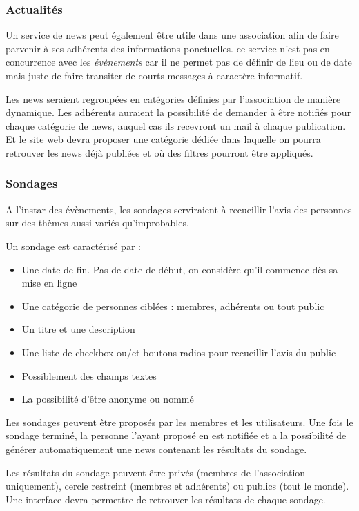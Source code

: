 \documentclass[a4paper,12pt]{article}
\begin{document}
\subsubsection{Actualités}
	Un service de news peut également être utile dans une association afin de faire parvenir à ses adhérents des informations ponctuelles. ce service n'est pas en concurrence avec les \textit{évènements} car il ne permet pas de définir de lieu ou de date mais juste de faire transiter de courts messages à caractère informatif.
\par
	Les news seraient regroupées en catégories définies par l'association de manière dynamique. Les adhérents auraient la possibilité de demander à être notifiés pour chaque catégorie de news, auquel cas ils recevront un mail à chaque publication. Et le site web devra proposer une catégorie dédiée dans laquelle on pourra retrouver les news déjà publiées et où des filtres pourront être appliqués.

\subsubsection{Sondages}
	A l'instar des évènements, les sondages serviraient à recueillir l'avis des personnes sur des thèmes aussi variés qu'improbables.
\par
	Un sondage est caractérisé par :
\begin{itemize}
	\item Une date de fin. Pas de date de début, on considère qu'il commence dès sa mise en ligne
	\item Une catégorie de personnes ciblées : membres, adhérents ou tout public
	\item Un titre et une description
	\item Une liste de checkbox ou/et boutons radios pour recueillir l'avis du public
	\item Possiblement des champs textes
	\item La possibilité d'être anonyme ou nommé
\end{itemize}

	Les sondages peuvent être proposés par les membres et les utilisateurs. Une fois le sondage terminé, la personne l'ayant proposé en est notifiée et a la possibilité de générer automatiquement une news contenant les résultats du sondage.
	
	Les résultats du sondage peuvent être privés (membres de l'association uniquement), cercle restreint (membres et adhérents) ou publics (tout le monde). Une interface devra permettre de retrouver les résultats de chaque sondage.
\end{document}
